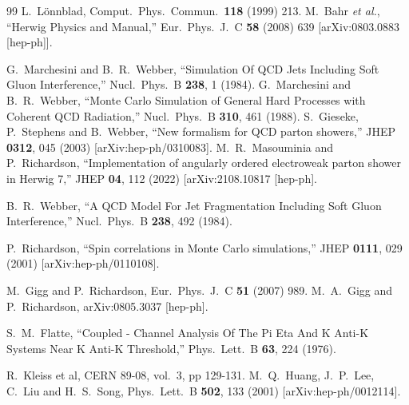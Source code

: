 \documentclass{article}
\begin{document}
\begin{thebibliography}{99}
 L.~L\"onnblad, Comput.~Phys.~Commun.\ {\bf 118} (1999) 213.
  M.~Bahr {\it et al.},
  ``Herwig Physics and Manual,''
  Eur.\ Phys.\ J.\  C {\bf 58} (2008) 639
  [arXiv:0803.0883 [hep-ph]].

  G.~Marchesini and B.~R.~Webber,
  ``Simulation Of QCD Jets Including Soft Gluon Interference,''
  Nucl.\ Phys.\  B {\bf 238}, 1 (1984).
  G.~Marchesini and B.~R.~Webber,
   ``Monte Carlo Simulation of General Hard Processes with Coherent QCD
  Radiation,''
  Nucl.\ Phys.\  B {\bf 310}, 461 (1988).
  S.~Gieseke, P.~Stephens and B.~Webber,
  ``New formalism for QCD parton showers,''
  JHEP {\bf 0312}, 045 (2003)
  [arXiv:hep-ph/0310083].
  M.~R.~Masouminia and P.~Richardson,
  ``Implementation of angularly ordered electroweak parton shower in Herwig 7,''
  JHEP {\bf 04}, 112 (2022)
  [arXiv:2108.10817 [hep-ph].

  B.~R.~Webber,
  ``A QCD Model For Jet Fragmentation Including Soft Gluon Interference,''
  Nucl.\ Phys.\  B {\bf 238}, 492 (1984).

  P.~Richardson,
  ``Spin correlations in Monte Carlo simulations,''
  JHEP {\bf 0111}, 029 (2001)
  [arXiv:hep-ph/0110108].

 M.~Gigg and P.~Richardson, 
Eur.\ Phys.\ J.\  C {\bf 51} (2007) 989.
  M.~A.~Gigg and P.~Richardson,
  arXiv:0805.3037 [hep-ph].

  S.~M.~Flatte,
   ``Coupled - Channel Analysis Of The Pi Eta And K Anti-K Systems Near K Anti-K
  Threshold,''
  Phys.\ Lett.\  B {\bf 63}, 224 (1976).

 R.~Kleiss et al, CERN 89-08, vol.~3, pp 129-131.
  M.~Q.~Huang, J.~P.~Lee, C.~Liu and H.~S.~Song,
  Phys.\ Lett.\  B {\bf 502}, 133 (2001)
  [arXiv:hep-ph/0012114].


\end{thebibliography}
\end{document}
